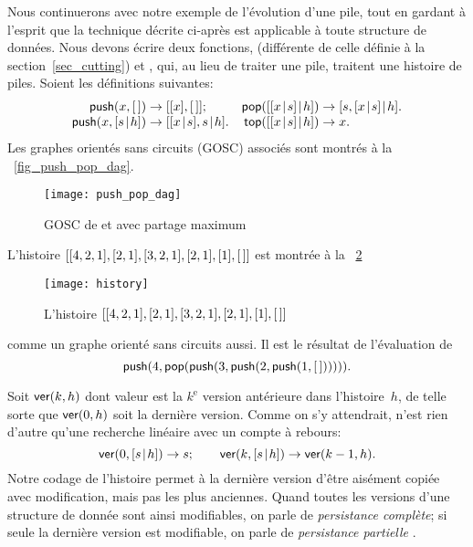 Nous continuerons avec notre exemple de l'évolution d'une pile, tout
en gardant à l'esprit que la technique décrite ci-après est applicable
à toute structure de données. Nous devons écrire deux fonctions,
 (différente de celle définie à
la section~\ref{sec_cutting}) et ,
qui, au lieu de traiter une pile, traitent une histoire de
piles. Soient les définitions suivantes:
\begin{equation}
\begin{array}{@{}r@{\;}c@{\;}l@{\quad}r@{\;}c@{\;}l@{}}
\fun{push}(x,\el) & \rightarrow & [[x],\el];
& \fun{pop}(\cons{\cons{x}{s}}{h}) & \rightarrow &
                                     \cons{s,\cons{x}{s}}{h}.\\
\fun{push}(x,\cons{s}{h}) & \rightarrow &
\cons{\cons{x}{s},s}{h}. & 
\fun{top}(\cons{\cons{x}{s}}{h}) & \rightarrow & x.
\end{array}
\label{eq_push_pop_persistence}
\end{equation}
Les graphes orientés sans circuits (GOSC) associés sont montrés à la
\fig~\vref{fig_push_pop_dag}.
\begin{figure}[b]
\centering
\texttt{[image: push\_pop\_dag]}
\caption{GOSC de  et  avec partage maximum
\label{fig_push_pop_dag}}
\end{figure}
L'histoire \([[4,2,1],[2,1],[3,2,1],[2,1],[1],[\,]]\) est montrée
à la \fig~\ref{fig_history}
\begin{figure}
\centering
\texttt{[image: history]}
\caption{L'histoire \([[4,2,1],[2,1],[3,2,1],[2,1],[1],[\,]]\)
\label{fig_history}}
\end{figure}
comme un graphe orienté sans circuits aussi. Il est le résultat de
l'évaluation de
\begin{equation}
\textsf{push}(4, \textsf{pop}(\textsf{push}(3, \textsf{push}(2,
\textsf{push}(1, [\,]))))).
\label{ex_history}
\end{equation}

Soit \(\textsf{ver}(k,h)\)  dont valeur est la
\(k^\text{e}\) version antérieure dans l'histoire~\(h\), de telle
sorte que \(\textsf{ver}(0,h)\) soit la dernière version. Comme on s'y
attendrait,  n'est rien d'autre qu'une recherche linéaire
avec un compte à rebours:
\begin{equation*}
\abovedisplayskip=3pt
\belowdisplayskip=3pt
\fun{ver}(0,\cons{s}{h}) \rightarrow s;\qquad
\fun{ver}(k,\cons{s}{h}) \rightarrow \fun{ver}(k-1,h).
\end{equation*}
Notre codage de l'histoire permet à la dernière version d'être
aisément copiée avec modification, mais pas les plus anciennes. Quand
toutes les versions d'une structure de donnée sont ainsi modifiables,
on parle de \emph{persistance complète}; si seule la dernière version est modifiable, on parle de
\emph{persistance partielle}
\citep{MehlhornTsakalidis_1990}.

